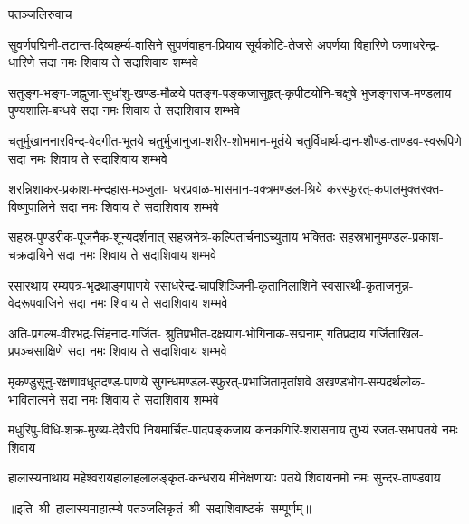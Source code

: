 
\centerline{पतञ्जलिरुवाच}
\fourlineindentedshloka
{सुवर्णपद्मिनी-तटान्त-दिव्यहर्म्य-वासिने}
{सुपर्णवाहन-प्रियाय सूर्यकोटि-तेजसे}
{अपर्णया विहारिणे फणाधरेन्द्र-धारिणे}
{सदा नमः शिवाय ते सदाशिवाय शम्भवे}

\fourlineindentedshloka
{सतुङ्ग-भङ्ग-जह्नुजा-सुधांशु-खण्ड-मौळये}
{पतङ्ग-पङ्कजासुहृत्-कृपीटयोनि-चक्षुषे}
{भुजङ्गराज-मण्डलाय पुण्यशालि-बन्धवे}
{सदा नमः शिवाय ते सदाशिवाय शम्भवे}

\fourlineindentedshloka
{चतुर्मुखाननारविन्द-वेदगीत-भूतये}
{चतुर्भुजानुजा-शरीर-शोभमान-मूर्तये}
{चतुर्विधार्थ-दान-शौण्ड-ताण्डव-स्वरूपिणे}
{सदा नमः शिवाय ते सदाशिवाय शम्भवे}

\fourlineindentedshloka
{शरन्निशाकर-प्रकाश-मन्दहास-मञ्जुला-}
{धरप्रवाळ-भासमान-वक्त्रमण्डल-श्रिये}
{करस्फुरत्-कपालमुक्तरक्त-विष्णुपालिने}
{सदा नमः शिवाय ते सदाशिवाय शम्भवे}

\fourlineindentedshloka
{सहस्र-पुण्डरीक-पूजनैक-शून्यदर्शनात्}
{सहस्रनेत्र-कल्पितार्चनाऽच्युताय भक्तितः}
{सहस्रभानुमण्डल-प्रकाश-चक्रदायिने}
{सदा नमः शिवाय ते सदाशिवाय शम्भवे}

\fourlineindentedshloka
{रसारथाय रम्यपत्र-भृद्रथाङ्गपाणये}
{रसाधरेन्द्र-चापशिञ्जिनी-कृतानिलाशिने}
{स्वसारथी-कृताजनुन्न-वेदरूपवाजिने}
{सदा नमः शिवाय ते सदाशिवाय शम्भवे}

\fourlineindentedshloka
{अति-प्रगल्भ-वीरभद्र-सिंहनाद-गर्जित-}
{श्रुतिप्रभीत-दक्षयाग-भोगिनाक-सद्मनाम्}
{गतिप्रदाय गर्जिताखिल-प्रपञ्चसाक्षिणे}
{सदा नमः शिवाय ते सदाशिवाय शम्भवे}

\fourlineindentedshloka
{मृकण्डुसूनु-रक्षणावधूतदण्ड-पाणये}
{सुगन्धमण्डल-स्फुरत्-प्रभाजितामृतांशवे}
{अखण्डभोग-सम्पदर्थलोक-भावितात्मने}
{सदा नमः शिवाय ते सदाशिवाय शम्भवे}

\twolineshloka
{मधुरिपु-विधि-शक्र-मुख्य-देवैरपि नियमार्चित-पादपङ्कजाय}
{कनकगिरि-शरासनाय तुभ्यं रजत-सभापतये नमः शिवाय}

\fourlineindentedshloka
{हालास्यनाथाय महेश्वराय}{हालाहलालङ्कृत-कन्धराय}
{मीनेक्षणायाः पतये शिवाय}{नमो नमः सुन्दर-ताण्डवाय}

॥इति~श्री~हालास्यमाहात्म्ये पतञ्जलिकृतं~श्री~सदाशिवाष्टकं~सम्पूर्णम्॥